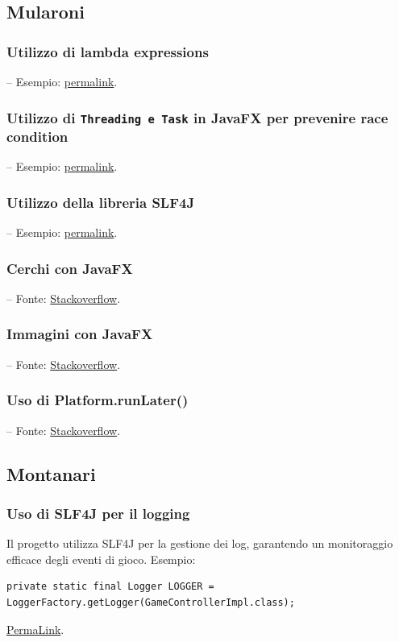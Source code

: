 \documentclass[a4paper,12pt]{report}
\begin{document}
\subsection{Mularoni}
\subsubsection{Utilizzo di lambda expressions} – Esempio: \href{https://github.com/Matt2309/temple-tower/blob/297b37062035f41c3e9258656beace208905a368/src/main/java/it/unibo/templetower/controller/GameControllerImpl.java#L206}{permalink}.
\subsubsection{Utilizzo di \texttt{Threading e Task} in JavaFX per prevenire race condition} – Esempio: \href{https://github.com/Matt2309/temple-tower/blob/297b37062035f41c3e9258656beace208905a368/src/main/java/it/unibo/templetower/view/MainFloorView.java#L90}{permalink}.
\subsubsection{Utilizzo della libreria SLF4J} – Esempio: \href{https://github.com/Matt2309/temple-tower/blob/297b37062035f41c3e9258656beace208905a368/src/test/java/it/unibo/templetower/ControllerTest.java#L27}{permalink}.
\subsubsection{Cerchi con JavaFX} – Fonte: \href{https://stackoverflow.com/questions/70876114/click-to-draw-a-shape-circle}{Stackoverflow}.
\subsubsection{Immagini con JavaFX} – Fonte: \href{https://stackoverflow.com/questions/52229984/javafx-imageview-actions}{Stackoverflow}.
\subsubsection{Uso di Platform.runLater()} – Fonte: \href{https://stackoverflow.com/questions/13784333/platform-runlater-and-task-in-javafx}{Stackoverflow}.

\subsection{Montanari}
\subsubsection{Uso di SLF4J per il logging}
Il progetto utilizza SLF4J per la gestione dei log, garantendo un monitoraggio efficace degli eventi di gioco. \newline
Esempio:
\begin{verbatim}
private static final Logger LOGGER = LoggerFactory.getLogger(GameControllerImpl.class);
\end{verbatim}
\href{https://github.com/Matt2309/temple-tower/blob/297b37062035f41c3e9258656beace208905a368/src/main/java/it/unibo/templetower/view/CombatView.java#L82}{PermaLink}.
\end{document}
